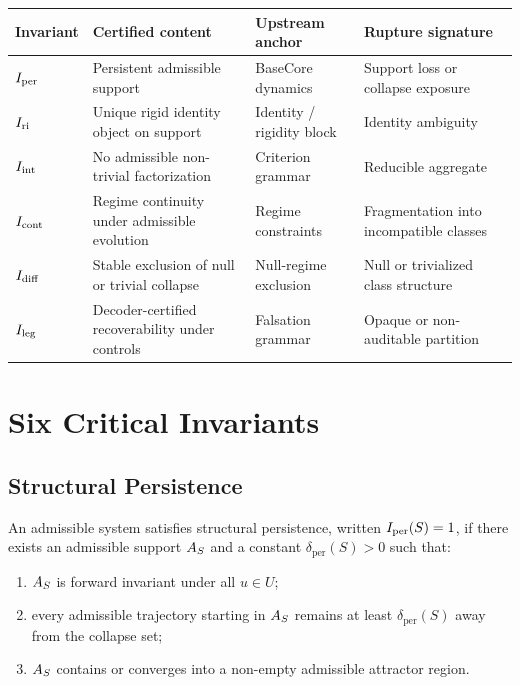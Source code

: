 \begin{center}
\small
\renewcommand{\arraystretch}{1.14}
\setlength{\tabcolsep}{4.5pt}
\begin{tabularx}{\textwidth}{P{1.45cm} Y P{2.8cm} P{3.2cm}}
\toprule
Invariant & Certified content & Upstream anchor & Rupture signature \\
\midrule
$I_{\mathrm{per}}$ & Persistent admissible support & BaseCore dynamics & Support loss or collapse exposure \\
$I_{\mathrm{ri}}$ & Unique rigid identity object on support & Identity / rigidity block & Identity ambiguity \\
$I_{\mathrm{int}}$ & No admissible non-trivial factorization & Criterion grammar & Reducible aggregate \\
$I_{\mathrm{cont}}$ & Regime continuity under admissible evolution & Regime constraints & Fragmentation into incompatible classes \\
$I_{\mathrm{diff}}$ & Stable exclusion of null or trivial collapse & Null-regime exclusion & Null or trivialized class structure \\
$I_{\mathrm{leg}}$ & Decoder-certified recoverability under controls & Falsation grammar & Opaque or non-auditable partition \\
\bottomrule
\end{tabularx}
\end{center}

\section{Six Critical Invariants}

\subsection{Structural Persistence}

\begin{definition}\label{def:iper}
An admissible system satisfies structural persistence, written $I_{\mathrm{per}}(S)=1$, if there exists an admissible support $A_S$ and a constant $\delta_{\mathrm{per}}(S)>0$ such that:
\begin{enumerate}[leftmargin=1.5em]
\item $A_S$ is forward invariant under all $u\in U$;
\item every admissible trajectory starting in $A_S$ remains at least $\delta_{\mathrm{per}}(S)$ away from the collapse set;
\item $A_S$ contains or converges into a non-empty admissible attractor region.
\end{enumerate}
\end{definition}

